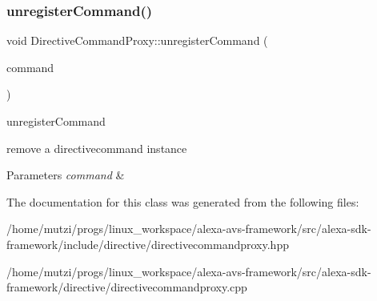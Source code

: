 \subsubsection{\texorpdfstring{unregister\+Command()}{unregisterCommand()}}
{\footnotesize\ttfamily void Directive\+Command\+Proxy\+::unregister\+Command (\begin{DoxyParamCaption}\item[{\hyperlink{classdirective_1_1DirectiveCommand}{Directive\+Command} $\ast$}]{command }\end{DoxyParamCaption})}



unregister\+Command 

remove a directivecommand instance 
\begin{DoxyParams}{Parameters}
{\em command} & \\
\hline
\end{DoxyParams}


The documentation for this class was generated from the following files\+:\begin{DoxyCompactItemize}
\item 
/home/mutzi/progs/linux\+\_\+workspace/alexa-\/avs-\/framework/src/alexa-\/sdk-\/framework/include/directive/directivecommandproxy.\+hpp\item 
/home/mutzi/progs/linux\+\_\+workspace/alexa-\/avs-\/framework/src/alexa-\/sdk-\/framework/directive/directivecommandproxy.\+cpp\end{DoxyCompactItemize}
